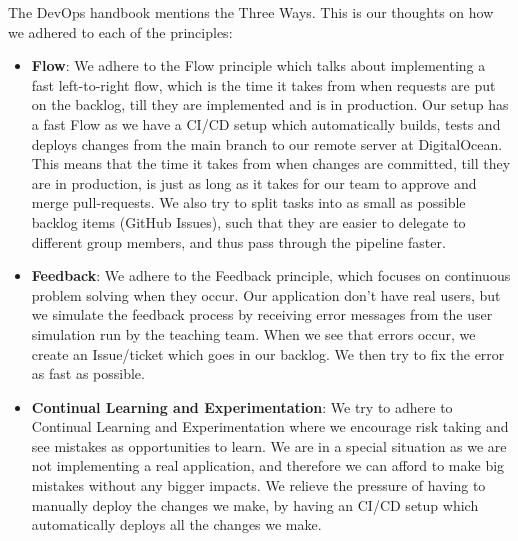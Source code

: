 The DevOps handbook \cite{kim2021devops} mentions the Three Ways. This is our thoughts on how we adhered to each of the principles:
\begin{itemize}
    \item \textbf{Flow}: We adhere to the Flow principle which talks about implementing a fast left-to-right flow, which is the time it takes from when requests are put on the backlog, till they are implemented and is in production. Our setup has a fast Flow as we have a CI/CD setup which automatically builds, tests and deploys changes from the main branch to our remote server at DigitalOcean. This means that the time it takes from when changes are committed, till they are in production, is just as long as it takes for our team to approve and merge pull-requests. We also try to split tasks into as small as possible backlog items (GitHub Issues), such that they are easier to delegate to different group members, and thus pass through the pipeline faster.
    \item \textbf{Feedback}: We adhere to the Feedback principle, which focuses on continuous problem solving when they occur. Our application don't have real users, but we simulate the feedback process by receiving error messages from the user simulation run by the teaching team. When we see that errors occur, we create an Issue/ticket which goes in our backlog. We then try to fix the error as fast as possible.
    \item \textbf{Continual Learning and Experimentation}: We try to adhere to Continual Learning and Experimentation where we encourage risk taking and see mistakes as opportunities to learn. We are in a special situation as we are not implementing a real application, and therefore we can afford to make big mistakes without any bigger impacts. We relieve the pressure of having to manually deploy the changes we make, by having an CI/CD setup which automatically deploys all the changes we make.
\end{itemize}
